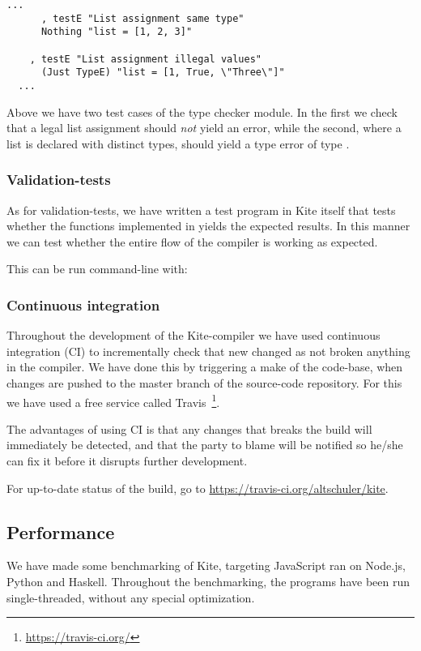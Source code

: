 \begin{lstlisting}[caption=\code{Kite.Test.TypeCheck.hs} snippet]
  ...
      , testE "List assignment same type"
      Nothing "list = [1, 2, 3]"

    , testE "List assignment illegal values"
      (Just TypeE) "list = [1, True, \"Three\"]"
  ...
\end{lstlisting}

Above we have two test cases of the type checker module. In the first we check that a legal list assignment should \emph{not} yield an error, while the second, where a list is declared with distinct types, should yield a type error of type .

\subsubsection{Validation-tests}

As for validation-tests, we have written a test program in Kite itself that tests whether the functions implemented in  yields the expected results. In this manner we can test whether the entire flow of the compiler is working as expected.

This can be run command-line with: 

\subsubsection{Continuous integration}
Throughout the development of the Kite-compiler we have used continuous integration (CI) to incrementally check that new changed as not broken anything in the compiler. We have done this by triggering a make of the code-base, when changes are pushed to the master branch of the source-code repository. For this we have used a free service called Travis~\footnote{\url{https://travis-ci.org/}}.

The advantages of using CI is that any changes that breaks the build will immediately be detected, and that the party to blame will be notified so he/she can fix it before it disrupts further development.

For up-to-date status of the build, go to \url{https://travis-ci.org/altschuler/kite}.


\subsection{Performance}
We have made some benchmarking of Kite, targeting JavaScript ran on Node.js, Python and Haskell. Throughout the benchmarking, the programs have been run single-threaded, without any special optimization.

